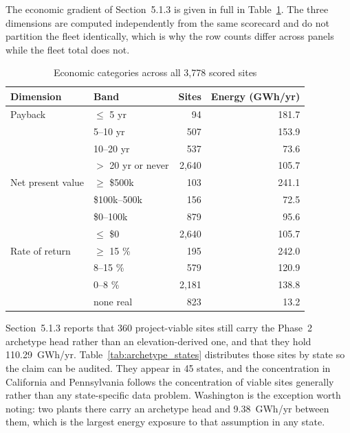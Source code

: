 \documentclass[12pt,letterpaper]{report}
\begin{document}
The economic gradient of Section~5.1.3 is given in full in
Table~\ref{tab:econ_grad}. The three dimensions are computed independently from the
same scorecard and do not partition the fleet identically, which is why the row
counts differ across panels while the fleet total does not.

\begin{table}[htbp]
\centering
\caption{Economic categories across all 3,778 scored sites}
\label{tab:econ_grad}
\footnotesize
\begin{tabular}{@{}llrr@{}}
\toprule
Dimension & Band & Sites & Energy (GWh/yr) \\
\midrule
Payback & $\leq$ 5 yr            & 94      & 181.7 \\
        & 5--10 yr               & 507     & 153.9 \\
        & 10--20 yr              & 537     & 73.6  \\
        & $>$ 20 yr or never     & 2{,}640 & 105.7 \\
\midrule
Net present value & $\geq$ \$500k  & 103     & 241.1 \\
                  & \$100k--500k   & 156     & 72.5  \\
                  & \$0--100k      & 879     & 95.6  \\
                  & $\leq$ \$0     & 2{,}640 & 105.7 \\
\midrule
Rate of return & $\geq$ 15 \%      & 195     & 242.0 \\
               & 8--15 \%          & 579     & 120.9 \\
               & 0--8 \%           & 2{,}181 & 138.8 \\
               & none real         & 823     & 13.2  \\
\bottomrule
\end{tabular}
\end{table}

Section~5.1.3 reports that 360 project-viable sites still carry the Phase~2
archetype head rather than an elevation-derived one, and that they hold
110.29~GWh/yr. Table~\ref{tab:archetype_states} distributes those sites by state so
the claim can be audited. They appear in 45 states, and the concentration in
California and Pennsylvania follows the concentration of viable sites generally
rather than any state-specific data problem. Washington is the exception worth
noting: two plants there carry an archetype head and 9.38~GWh/yr between them,
which is the largest energy exposure to that assumption in any state.
\end{document}
